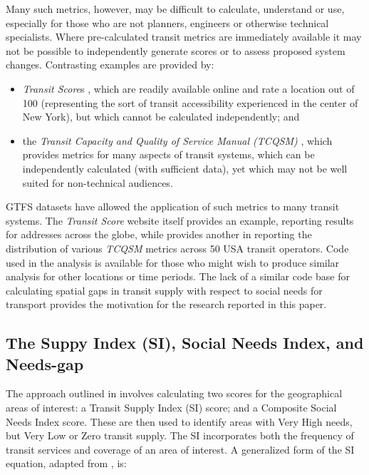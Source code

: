 \documentclass[preprint, 3p,
authoryear]{elsarticle} %
\begin{document}
Many such metrics, however, may be difficult to calculate, understand or
use, especially for those who are not planners, engineers or otherwise
technical specialists. Where pre-calculated transit metrics are
immediately available it may not be possible to independently generate
scores or to assess proposed system changes. Contrasting examples are
provided by:

\begin{itemize}
\item
  \emph{Transit Score}s \citep{WalkScore:2023tg}, which are readily
  available online and rate a location out of 100 (representing the sort
  of transit accessibility experienced in the center of New York), but
  which cannot be calculated independently; and
\item
  the \emph{Transit Capacity and Quality of Service Manual (TCQSM)}
  \citep{TCQSM:2013}, which provides metrics for many aspects of transit
  systems, which can be independently calculated (with sufficient data),
  yet which may not be well suited for non-technical audiences.
\end{itemize}

GTFS datasets have allowed the application of such metrics to many
transit systems. The \emph{Transit Score} website itself provides an
example, reporting results for addresses across the globe, while
\citet{Wong:2013aa} provides another in reporting the distribution of
various \emph{TCQSM} metrics across 50 USA transit operators. Code used
in the \citet{Wong:2013aa} analysis is available for those who might
wish to produce similar analysis for other locations or time periods.
The lack of a similar code base for calculating spatial gaps in transit
supply with respect to social needs for transport provides the
motivation for the research reported in this paper.

\subsection{The Suppy Index (SI), Social Needs Index, and
Needs-gap}\label{the-suppy-index-si-social-needs-index-and-needs-gap}

The approach outlined in \citet{currie2010identifying} involves
calculating two scores for the geographical areas of interest: a Transit
Supply Index (SI) score; and a Composite Social Needs Index score. These
are then used to identify areas with Very High needs, but Very Low or
Zero transit supply. The SI incorporates both the frequency of transit
services and coverage of an area of interest. A generalized form of the
SI equation, adapted from \citet{currie2010identifying}, is:
\end{document}
